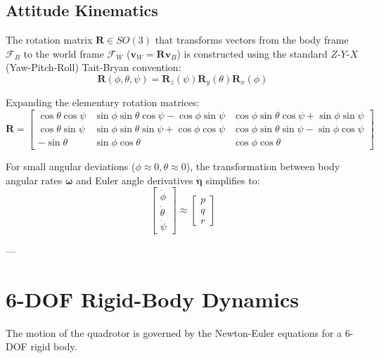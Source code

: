 \documentclass[11pt,a4paper]{article}
\begin{document}
\subsection{Attitude Kinematics}
The rotation matrix $\mathbf{R} \in SO(3)$ that transforms vectors from the body frame $\mathcal{F}_B$ to the world frame $\mathcal{F}_W$ ($\mathbf{v}_W = \mathbf{R} \mathbf{v}_B$) is constructed using the standard $Z$-$Y$-$X$ (Yaw-Pitch-Roll) Tait-Bryan convention:
\begin{equation}
\mathbf{R}(\phi, \theta, \psi) = \mathbf{R}_z(\psi) \mathbf{R}_y(\theta) \mathbf{R}_x(\phi)
\end{equation}

Expanding the elementary rotation matrices:
\begin{equation}
\mathbf{R} = \begin{bmatrix}
\cos\theta \cos\psi & \sin\phi \sin\theta \cos\psi - \cos\phi \sin\psi & \cos\phi \sin\theta \cos\psi + \sin\phi \sin\psi \\
\cos\theta \sin\psi & \sin\phi \sin\theta \sin\psi + \cos\phi \cos\psi & \cos\phi \sin\theta \sin\psi - \sin\phi \cos\psi \\
-\sin\theta & \sin\phi \cos\theta & \cos\phi \cos\theta
\end{bmatrix}
\end{equation}

For small angular deviations ($\phi \approx 0, \theta \approx 0$), the transformation between body angular rates $\boldsymbol{\omega}$ and Euler angle derivatives $\dot{\boldsymbol{\eta}}$ simplifies to:
\begin{equation}
\begin{bmatrix} \dot{\phi} \\ \dot{\theta} \\ \dot{\psi} \end{bmatrix} \approx \begin{bmatrix} p \\ q \\ r \end{bmatrix}
\end{equation}

---

\section{6-DOF Rigid-Body Dynamics}

The motion of the quadrotor is governed by the Newton-Euler equations for a 6-DOF rigid body.
\end{document}
